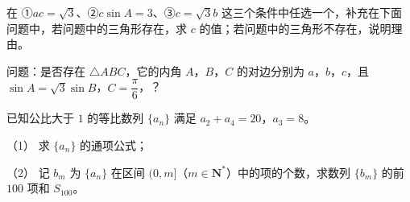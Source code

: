 \begin{question}
在 ①$ac=\sqrt3$、②$c\sin A=3$、③$c=\sqrt3b$ 这三个条件中任选一个，补充在下面问题中，若问题中的三角形存在，求 $c$ 的值；若问题中的三角形不存在，说明理由。

问题：是否存在 $\triangle ABC$，它的内角 $A$，$B$，$C$ 的对边分别为 $a$，$b$，$c$，且 $\sin A=\sqrt3\sin B$，$C=\dfrac\pi6$，\gkblank{}？

\end{question}
\begin{question}
已知公比大于 $1$ 的等比数列 $\{a_n\}$ 满足 $a_2+a_4=20$，$a_3=8$。

（1） 求 $\{a_n\}$ 的通项公式；

（2） 记 $b_m$ 为 $\{a_n\}$ 在区间 $(0,m]$（$m\in\mathbf N^*$）中的项的个数，求数列 $\{b_m\}$ 的前 $100$ 项和 $S_{100}$。

\end{question}
